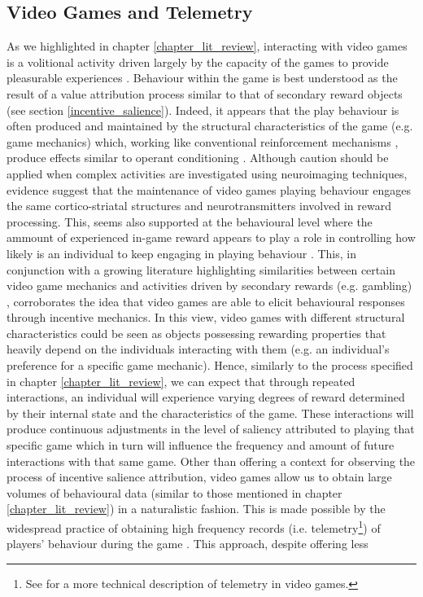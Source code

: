 \subsection{Video Games and Telemetry}
\label{videogame_telemetries}
As we highlighted in chapter \ref{chapter_lit_review}, interacting with video games is a volitional activity driven largely by the capacity of the games to provide pleasurable experiences \cite{boyle2012engagement}. Behaviour within the game is best understood as the result of a value attribution process similar to that of secondary reward objects (see section \ref{incentive_salience}). Indeed, it appears that the play behaviour is often produced and maintained by the structural characteristics of the game (e.g. game mechanics) \cite{king2010video} which, working like conventional reinforcement mechanisms \cite{chumbley2006affect,wang2011game,phillips2013videogame,avserivskis2017computational}, produce effects similar to operant conditioning \cite{skinner1965science}. Although caution should be applied when complex activities are investigated using neuroimaging techniques, evidence suggest that the maintenance of video games playing behaviour engages the same cortico-striatal structures \cite{hoeft2008gender,mathiak2011reward,cole2012interactivity,klasen2012neural,lorenz2015video,gleich2017functional} and neurotransmitters \cite{koepp1998evidence} involved in reward processing. This, seems also supported at the behavioural level where the ammount of experienced in-game reward appears to play a role in controlling how likely is an individual to keep engaging in playing behaviour \cite{agarwal2017quitting, steyvers2019joint}. This, in conjunction with a growing literature highlighting similarities between certain video game mechanics and activities driven by secondary rewards (e.g. gambling) \cite{king2010role,drummond2018video,zendle2018video}, corroborates the idea that video games are able to elicit behavioural responses through incentive mechanics. In this view, video games with different structural characteristics could be seen as objects possessing rewarding properties that heavily depend on the individuals interacting with them (e.g. an individual's preference for a specific game mechanic). Hence, similarly to the process specified in chapter \ref{chapter_lit_review}, we can expect that through repeated interactions, an individual will experience varying degrees of reward determined by their internal state and the characteristics of the game. These interactions will produce continuous adjustments in the level of saliency attributed to playing that specific game which in turn will influence the frequency and amount of future interactions with that same game. Other than offering a context for observing the process of incentive salience attribution, video games allow us to obtain large volumes of behavioural data (similar to those mentioned in chapter \ref{chapter_lit_review}) in a naturalistic fashion. This is made possible by the widespread practice of obtaining high frequency records (i.e. telemetry\footnote{See \cite{el2016game} for a more technical description of telemetry in video games.}) of players' behaviour during the game \cite{drachen2015behavioral}. This approach, despite offering less 